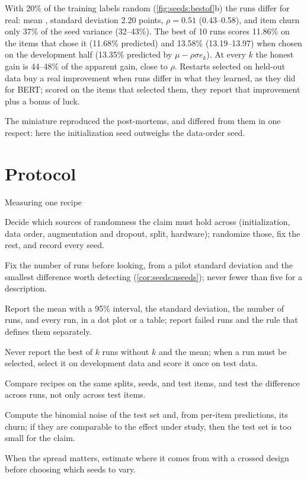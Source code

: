 \begin{refsection}
With 20\% of the training labels random (\cref{fig:seeds:bestof}b) the runs differ for real: mean , standard deviation 2.20 points, $\rho=0.51$ (0.43--0.58), and item churn only 37\% of the seed variance (32--43\%). The best of 10 runs scores 11.86\% on the items that chose it (11.68\% predicted) and 13.58\% (13.19--13.97) when chosen on the development half (13.35\% predicted by $\mu-\rho\sigma e_k$). At every $k$ the honest gain is 44--48\% of the apparent gain, close to $\rho$. Restarts selected on held-out data buy a real improvement when runs differ in what they learned, as they did for BERT; scored on the items that selected them, they report that improvement plus a bonus of luck.

The miniature reproduced the post-mortems, and differed from them in one respect: here the initialization seed outweighs the data-order seed.

\section{Protocol}\label{sec:seeds:protocol}

\begin{protocol}{Measuring one recipe}\label{prot:seeds:measure}
\item Decide which sources of randomness the claim must hold across (initialization, data order, augmentation and dropout, split, hardware); randomize those, fix the rest, and record every seed.
\item Fix the number of runs before looking, from a pilot standard deviation and the smallest difference worth detecting (\cref{cor:seeds:nseeds}); never fewer than five for a description.
\item Report the mean with a 95\% interval, the standard deviation, the number of runs, and every run, in a dot plot or a table; report failed runs and the rule that defines them separately.
\item Never report the best of $k$ runs without $k$ and the mean; when a run must be selected, select it on development data and score it once on test data.
\item Compare recipes on the same splits, seeds, and test items, and test the difference across runs, not only across test items.
\item Compute the binomial noise of the test set and, from per-item predictions, its churn; if they are comparable to the effect under study, then the test set is too small for the claim.
\item When the spread matters, estimate where it comes from with a crossed design before choosing which seeds to vary.
\end{protocol}


\end{refsection}

